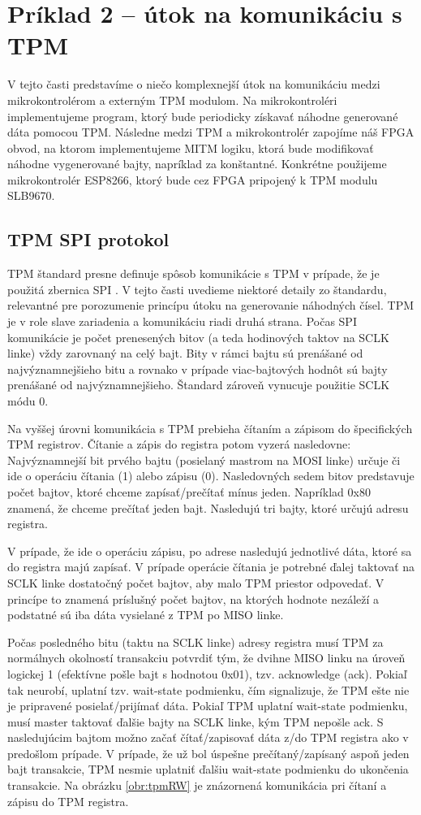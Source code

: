 \section{Príklad 2 -- útok na komunikáciu s TPM} \label{sek:example2}
V tejto časti predstavíme o niečo komplexnejší útok na komunikáciu medzi mikrokontrolérom a externým TPM modulom. Na mikrokontroléri implementujeme program, ktorý bude periodicky získavať náhodne generované dáta pomocou TPM. Následne medzi TPM a mikrokontrolér zapojíme náš FPGA obvod, na ktorom implementujeme MITM logiku, ktorá bude modifikovať náhodne vygenerované bajty, napríklad za konštantné. Konkrétne použijeme mikrokontrolér ESP8266, ktorý bude cez FPGA pripojený k TPM modulu SLB9670.

\subsection{TPM SPI protokol} \label{subsek:tpmSpi}
TPM štandard presne definuje spôsob komunikácie s TPM v prípade, že je použitá zbernica SPI \cite{tpmTis}. V tejto časti uvedieme niektoré detaily zo štandardu, relevantné pre porozumenie princípu útoku na generovanie náhodných čísel. TPM je v role slave zariadenia a komunikáciu riadi druhá strana. Počas SPI komunikácie je počet prenesených bitov (a teda hodinových taktov na SCLK linke) vždy zarovnaný na celý bajt. Bity v rámci bajtu sú prenášané od najvýznamnejšieho bitu a rovnako v prípade viac-bajtových hodnôt sú bajty prenášané od najvýznamnejšieho. Štandard zároveň vynucuje použitie SCLK módu 0.

Na vyššej úrovni komunikácia s TPM prebieha čítaním a zápisom do špecifických TPM registrov. Čítanie a zápis do registra potom vyzerá nasledovne: Najvýznamnejší bit prvého bajtu (posielaný mastrom na MOSI linke) určuje či ide o operáciu čítania (1) alebo zápisu (0). Nasledovných sedem bitov predstavuje počet bajtov, ktoré chceme zapísať/prečítať mínus jeden. Napríklad 0x80 znamená, že chceme prečítať jeden bajt. Nasledujú tri bajty, ktoré určujú adresu registra.

V prípade, že ide o operáciu zápisu, po adrese nasledujú jednotlivé dáta, ktoré sa do registra majú zapísať. V prípade operácie čítania je potrebné ďalej taktovať na SCLK linke dostatočný počet bajtov, aby malo TPM priestor odpovedať. V princípe to znamená  príslušný počet bajtov, na ktorých hodnote nezáleží a podstatné sú iba dáta vysielané z TPM po MISO linke.

Počas posledného bitu (taktu na SCLK linke) adresy registra musí TPM za normálnych okolností transakciu potvrdiť tým, že dvihne MISO linku na úroveň logickej 1 (efektívne pošle bajt s hodnotou 0x01), tzv. acknowledge (ack). Pokiaľ tak neurobí, uplatní tzv. wait-state podmienku, čím signalizuje, že TPM ešte nie je pripravené posielať/prijímať dáta. Pokiaľ TPM uplatní wait-state podmienku, musí master taktovať ďalšie bajty na SCLK linke, kým TPM nepošle ack. S nasledujúcim bajtom možno začať čítať/zapisovať dáta z/do TPM registra ako v predošlom prípade. V prípade, že už bol úspešne prečítaný/zapísaný aspoň jeden bajt transakcie, TPM nesmie uplatniť ďalšiu wait-state podmienku do ukončenia transakcie. Na obrázku \ref{obr:tpmRW} je znázornená komunikácia pri čítaní a zápisu do TPM registra.

